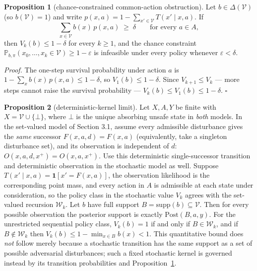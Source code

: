 \documentclass[10pt,twocolumn]{article}
\theoremstyle{definition}
\newtheorem{proposition}{Proposition}
\begin{document}
\begin{proposition}[chance-constrained common-action obstruction]\label{calc-prop:chance}
Let \(b \in \Delta(\mathcal{V})\) (so \(b(\mathcal{V}) = 1\)) and write \(p(x,a) = 1 - \sum_{x' \in \mathcal{V}} T(x' \mid x, a)\). If
\[
\sum_{x \in \mathcal{V}} b(x)\, p(x,a) \;\ge\; \delta \qquad \text{for every } a \in A,
\]
then \(V_{k}(b) \le 1 - \delta\) for every \(k \ge 1\), and the chance constraint \(\mathbb{P}_{b,\pi}(x_{0}, \dots, x_{k} \in \mathcal{V}) \ge 1 - \varepsilon\) is infeasible under every policy whenever \(\varepsilon < \delta\).
\end{proposition}

\emph{Proof.} The one-step survival probability under action \(a\) is \(1 - \sum_{x} b(x)\, p(x,a) \le 1 - \delta\), so \(V_{1}(b) \le 1 - \delta\). Since \(V_{k+1} \le V_{k}\) --- more steps cannot raise the survival probability --- \(V_{k}(b) \le V_{1}(b) \le 1 - \delta\). \hfill\(\square\)

\begin{proposition}[deterministic-kernel limit]\label{calc-prop:degenerate}
Let \(X,A,Y\) be finite with \(X=\mathcal V\cup\{\bot\}\), where
\(\bot\) is the unique absorbing unsafe state in \emph{both} models.
In the set-valued model of Section 3.1, assume every admissible
disturbance gives the \emph{same} successor
\(F(x,a,d)=F(x,a)\) (equivalently, take a singleton disturbance set),
and its observation is independent of \(d\):
\(O(x,a,d,x^{+})=O(x,a,x^{+})\). Use this deterministic
single-successor transition and deterministic observation in the
stochastic model as well. Suppose
\(T(x'\mid x,a)=\mathbf{1}[x'=F(x,a)]\), the observation likelihood is
the corresponding point mass, and every action in \(A\) is admissible
at each state under consideration, so the policy class in the stochastic
value \(V_k\) agrees with the set-valued recursion \(\mathcal W_k\).
Let \(b\) have full support \(B=\mathrm{supp}(b)\subseteq\mathcal V\).
Then for every possible observation the posterior support is exactly
\(\mathrm{Post}(B,a,y)\). For the unrestricted sequential policy class,
\(V_k(b)=1\) if and only if \(B\in\mathcal W_k\), and if
\(B\notin\mathcal W_k\) then
\(V_k(b)\le 1-\min_{x\in B}b(x)<1\).
This quantitative bound does \emph{not} follow merely because a
stochastic transition has the same support as a set of possible
adversarial disturbances; such a fixed stochastic kernel is governed
instead by its transition probabilities and Proposition~\ref{calc-prop:chance}.
\end{proposition}
\end{document}
